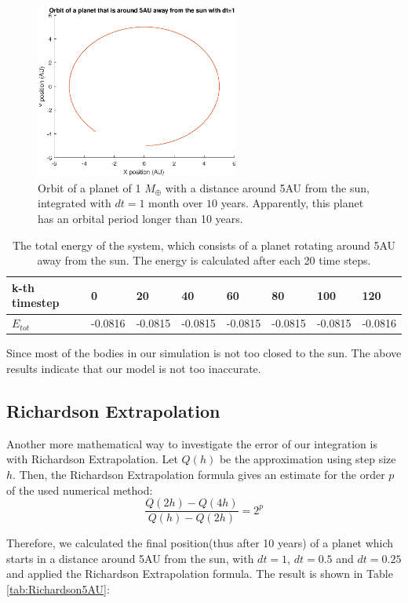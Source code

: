 \begin{figure}[H]
\centering
\includegraphics[width=0.6\textwidth]{Planeet_5AU_dt1_10jaar.eps}
\caption{Orbit of a planet of 1 $M_{\oplus}$ with a distance around 5AU from the sun, integrated with $dt=1$ month over $10$ years. Apparently, this planet has an orbital period longer than 10 years.}
    \label{fig:Planet5AUdt1}
\end{figure}

\begin{table}[htb]
\centering
\caption{The total energy of the system, which consists of a planet rotating around 5AU away from the sun. The energy is calculated after each 20 time steps.}
\begin{tabular}{|l|l|l|l|l|l|l|l|}
\hline
k-th timestep&0&20&40&60&80&100&120\\ \hline
$E_{tot}$&-0.0816&   -0.0815&   -0.0815&   -0.0815&   -0.0815&   -0.0815&   -0.0816\\ \hline
\end{tabular}
\label{tab:Planet5AUEnergy}
\end{table}

Since most of the bodies in our simulation is not too closed to the sun. 
The above results indicate that our model is not too inaccurate.

\subsection{Richardson Extrapolation}
Another more mathematical way to investigate the error of our integration is with Richardson Extrapolation. 
Let $Q(h)$ be the approximation using step size $h$. 
Then, the Richardson Extrapolation formula \cite{Richardson} gives an estimate for the order $p$ of the used numerical method:
\[\frac{Q(2h)-Q(4h)}{Q(h)-Q(2h)}=2^p\]

Therefore, we calculated the final position(thus after 10 years) of a planet which starts in a distance around 5AU from the sun, with $dt=1$, $dt=0.5$ and $dt=0.25$ and applied the Richardson Extrapolation formula. 
The result is shown in Table \ref{tab:Richardson5AU}:


